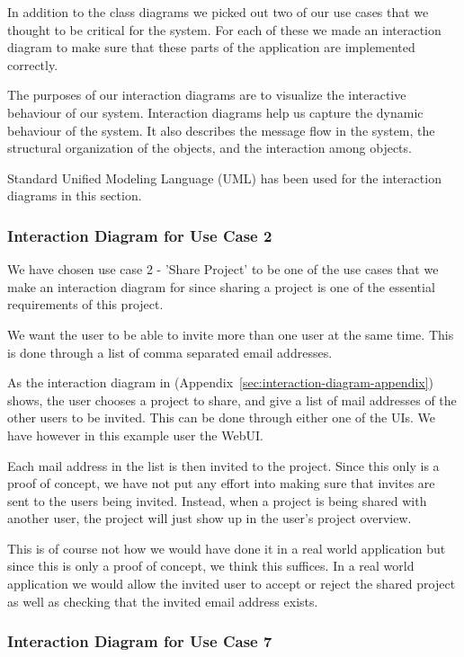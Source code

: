 In addition to the class diagrams we picked out two of our use cases that we thought to be critical for the system. For each of these we made an interaction diagram
to make sure that these parts of the application are implemented correctly. 

The purposes of our interaction diagrams are to visualize the interactive behaviour of our system. Interaction diagrams help us capture the dynamic behaviour of 
the system. It also describes the message flow in the system, the structural organization of the objects, and the interaction among objects.

Standard Unified Modeling Language (UML) has been used for the interaction diagrams in this section.

\subsubsection{Interaction Diagram for Use Case 2}

We have chosen use case 2 - 'Share Project' to be one of the use cases that we make an interaction diagram for since sharing a project is one of the essential
requirements of this project. 

We want the user to be able to invite more than one user at the same time. This is done through a list of comma separated email addresses. 

As the interaction diagram in (Appendix~\ref{sec:interaction-diagram-appendix})
shows, the user chooses a project to share, and give a list of mail addresses of the other users to be invited. This can be done through
either one of the UIs. We have however in this example user the WebUI. 

Each mail address in the list is then invited to the project. Since this only is a proof of concept, we have not put any effort into making sure that invites 
are sent to the users being invited. Instead, when a project is being shared with another user, the project will just show up in the user's project overview.

This is of course not how we would have done it in a real world application but since this is only a proof of concept, we think this suffices. In a 
real world application we would allow the invited user to accept or reject the shared project as well as checking that the invited email address exists.

\subsubsection{Interaction Diagram for Use Case 7}

